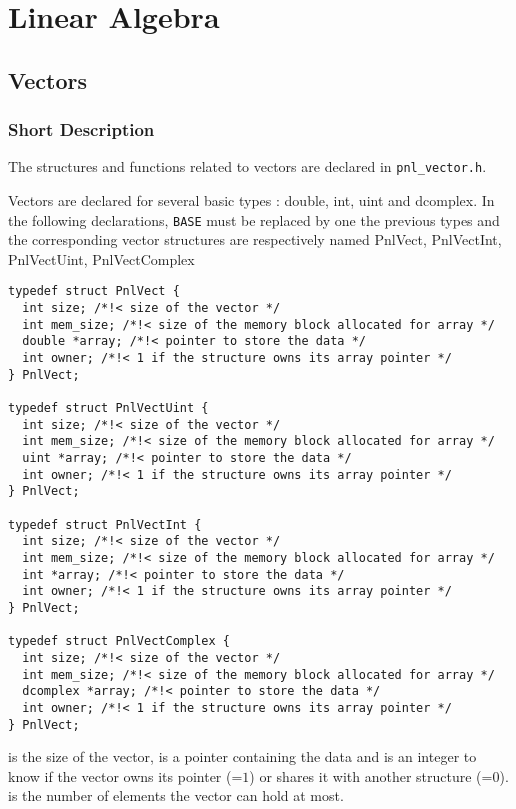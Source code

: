 \section{Linear Algebra}


\subsection{Vectors}
\subsubsection{Short Description}

The structures and functions related to vectors are declared in
\verb!pnl_vector.h!.


Vectors are declared for several basic types : double, int, uint and
dcomplex. In the following declarations, {\tt BASE} must be replaced by one
the previous types and the corresponding vector structures are respectively
named PnlVect, PnlVectInt, PnlVectUint, PnlVectComplex
\begin{verbatim}
typedef struct PnlVect {
  int size; /*!< size of the vector */
  int mem_size; /*!< size of the memory block allocated for array */
  double *array; /*!< pointer to store the data */
  int owner; /*!< 1 if the structure owns its array pointer */
} PnlVect;

typedef struct PnlVectUint {
  int size; /*!< size of the vector */ 
  int mem_size; /*!< size of the memory block allocated for array */
  uint *array; /*!< pointer to store the data */
  int owner; /*!< 1 if the structure owns its array pointer */
} PnlVect;

typedef struct PnlVectInt {
  int size; /*!< size of the vector */ 
  int mem_size; /*!< size of the memory block allocated for array */
  int *array; /*!< pointer to store the data */
  int owner; /*!< 1 if the structure owns its array pointer */
} PnlVect;

typedef struct PnlVectComplex {
  int size; /*!< size of the vector */ 
  int mem_size; /*!< size of the memory block allocated for array */
  dcomplex *array; /*!< pointer to store the data */
  int owner; /*!< 1 if the structure owns its array pointer */
} PnlVect;
\end{verbatim}
 is the size of the vector,  is a pointer containing the
data and  is an integer to know if the vector owns its 
pointer (=$1$) or shares it with another structure (=$0$).
 is the number of elements the vector can hold at most.

